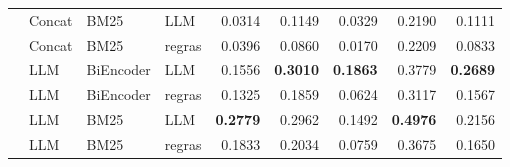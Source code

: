 \begin{table}[h]
\begin{tabular}{llllrrrrr}
 & Concat & BM25 & LLM & 0.0314 & 0.1149 & 0.0329 & 0.2190 & 0.1111 \\
 & Concat & BM25 & regras & 0.0396 & 0.0860 & 0.0170 & 0.2209 & 0.0833 \\
 & LLM & BiEncoder & LLM & 0.1556 & \textbf{0.3010} & \textbf{0.1863} & 0.3779 & \textbf{0.2689} \\
 & LLM & BiEncoder & regras & 0.1325 & 0.1859 & 0.0624 & 0.3117 & 0.1567 \\
 & LLM & BM25 & LLM & \textbf{0.2779} & 0.2962 & 0.1492 & \textbf{0.4976} & 0.2156 \\
 & LLM & BM25 & regras & 0.1833 & 0.2034 & 0.0759 & 0.3675 & 0.1650 \\
\bottomrule
\end{tabular}
\end{table}
